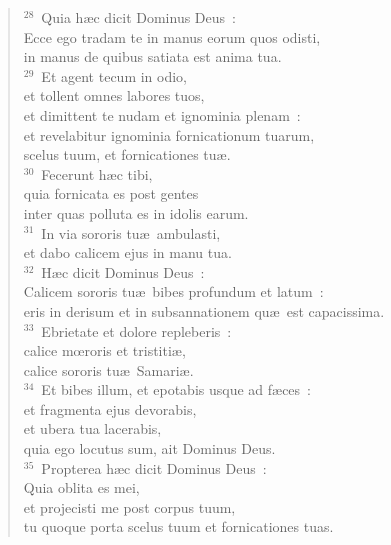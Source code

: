 \begin{flushleft}\begin{verse}${}^{28}$~Quia h\ae c dicit Dominus Deus~:\\ Ecce ego tradam te in manus eorum quos odisti,\\ in manus de quibus satiata est anima tua.\\
${}^{29}$~Et agent tecum in odio,\\ et tollent omnes labores tuos,\\ et dimittent te nudam et ignominia plenam~:\\ et revelabitur ignominia fornicationum tuarum,\\ scelus tuum, et fornicationes tu\ae .\\
${}^{30}$~Fecerunt h\ae c tibi,\\ quia fornicata es post gentes\\ inter quas polluta es in idolis earum.\\
${}^{31}$~In via sororis tu\ae\ ambulasti,\\ et dabo calicem ejus in manu tua.\\
${}^{32}$~H\ae c dicit Dominus Deus~:\\ Calicem sororis tu\ae\ bibes profundum et latum~:\\ eris in derisum et in subsannationem qu\ae\ est capacissima.\\
${}^{33}$~Ebrietate et dolore repleberis~:\\ calice mœroris et tristiti\ae ,\\ calice sororis tu\ae\ Samari\ae .\\
${}^{34}$~Et bibes illum, et epotabis usque ad f\ae ces~:\\ et fragmenta ejus devorabis,\\ et ubera tua lacerabis,\\ quia ego locutus sum, ait Dominus Deus.\\
${}^{35}$~Propterea h\ae c dicit Dominus Deus~:\\ Quia oblita es mei,\\ et projecisti me post corpus tuum,\\ tu quoque porta scelus tuum et fornicationes tuas.\end{verse}\end{flushleft}


